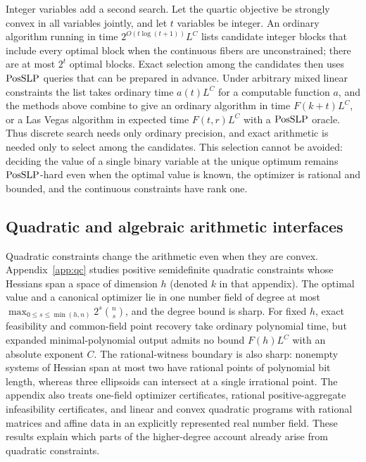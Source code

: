 Integer variables add a second search. Let the quartic objective be strongly
convex in all variables jointly, and let $t$ variables be integer. An
ordinary algorithm running in time $2^{O(t\log(t+1))}L^C$ lists candidate
integer blocks that include every optimal block when the continuous fibers
are unconstrained; there are at most $2^t$ optimal blocks. Exact selection
among the candidates then uses $\mathrm{PosSLP}$ queries that can be prepared in
advance. Under arbitrary mixed linear constraints the list takes ordinary
time $a(t)L^C$ for a computable function $a$, and the methods above combine
to give an ordinary algorithm in time $F(k+t)L^C$, or a Las Vegas algorithm
in expected time $F(t,r)L^C$ with a $\mathrm{PosSLP}$ oracle. Thus discrete search
needs only ordinary precision, and exact arithmetic is needed only to select
among the candidates. This selection cannot be avoided: deciding the value of
a single binary variable at the unique optimum remains $\mathrm{PosSLP}$-hard even
when the optimal value is known, the optimizer is rational and bounded, and
the continuous constraints have rank one.

\subsection{Quadratic and algebraic arithmetic interfaces}
\label{sec:intro-further-arithmetic}

Quadratic constraints change the arithmetic even when they are convex.
Appendix~\ref{app:qc} studies positive semidefinite quadratic constraints
whose Hessians span a space of dimension $h$ (denoted $k$ in that appendix).
The optimal value and a
canonical optimizer lie in one number field of degree at most
$\max_{0\le s\le\min(h,n)}2^s\binom ns$, and the degree bound is sharp.
For fixed $h$, exact feasibility and common-field point recovery take
ordinary polynomial time, but expanded minimal-polynomial output admits no
bound $F(h)L^C$ with an absolute exponent $C$. The rational-witness boundary
is also sharp: nonempty systems of Hessian span at most two have rational
points of polynomial bit length, whereas three ellipsoids can intersect at a
single irrational point. The appendix also treats one-field optimizer
certificates, rational positive-aggregate infeasibility certificates, and
linear and convex quadratic programs with rational matrices and affine data
in an explicitly represented real number field. These results explain which
parts of the higher-degree account already arise from quadratic constraints.

